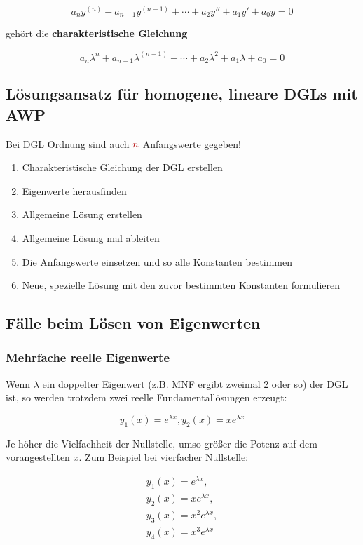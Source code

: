 \documentclass[12pt, a4paper]{scrreprt}
\begin{document}
\[
  a_n y^{(n)}-a_{n-1}y^{(n-1)}+ \cdots +a_2y''+a_1y'+a_0y=0
\]

gehört die \textbf{charakteristische Gleichung}

\[
  a_n\lambda^n+a_{n-1}\lambda^{(n-1)}+ \cdots + a_2\lambda^2+a_1\lambda+a_0=0
\]

\subsection{Lösungsansatz für homogene, lineare DGLs mit AWP}

Bei DGL  Ordnung sind auch \(\mytextred{n}\) Anfangswerte gegeben!

\begin{enumerate}
\item Charakteristische Gleichung der DGL erstellen
\item Eigenwerte herausfinden
\item Allgemeine Lösung erstellen
\item Allgemeine Lösung  mal ableiten
\item Die Anfangswerte einsetzen und so alle Konstanten bestimmen
\item Neue, spezielle Lösung mit den zuvor bestimmten Konstanten formulieren
\end{enumerate}

\subsection{Fälle beim Lösen von Eigenwerten}

\subsubsection{Mehrfache reelle Eigenwerte}

Wenn \(\lambda\) ein doppelter Eigenwert (z.B. MNF ergibt zweimal 2 oder so) der DGL ist, so werden trotzdem zwei reelle Fundamentallösungen erzeugt:

\[
  y_1(x)=e^{\lambda x}, y_2(x)=xe^{\lambda x}
\]

Je höher die Vielfachheit der Nullstelle, umso größer die Potenz auf dem vorangestellten \(x\). Zum Beispiel bei vierfacher Nullstelle:

\[
  \begin{split}
    y_1(x)=e^{\lambda x},\\
    y_2(x)=xe^{\lambda x},\\
    y_3(x)=x^2e^{\lambda x},\\
    y_4(x)=x^3e^{\lambda x}
  \end{split}
\]
\end{document}
